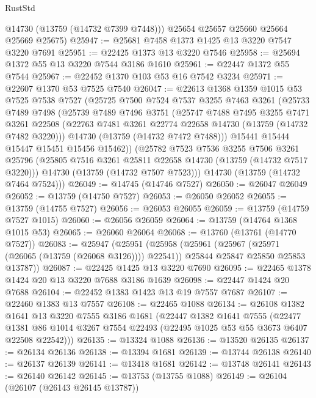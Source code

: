 \begin{lexlean}{RustStd}
\begin{coremodule}
        @14730
        (@13759 (@14732 @7399 @7448)))
      @25654
      @25657
      @25660
      @25664
      @25669
      @25675)
@25947 := @25681 @7458 @1373 @1425 @13 @3220 @7547 @3220 @7691
@25951 := @22425 @1373 @13 @3220 @7546
@25958 := @25694 @1372 @55 @13 @3220 @7544 @3186 @1610
@25961 := @22447 @1372 @55 @7544
@25967 := @22452 @1370 @103 @53 @16 @7542 @3234
@25971 := @22607 @1370 @53 @7525 @7540
@26047 := @22613
    @1368
    @1359
    @1015
    @53
    @7525
    @7538
    @7527
    (@25725
      @7500
      @7524
      @7537
      @3255
      @7463
      @3261
      (@25733
        @7489
        @7498
        (@25739
          @7489
          @7496
          @3751
          (@25747
            @7488
            @7495
            @3255
            @7471
            @3261
            @22508
            (@22763 @7481 @3261 @22774 @22658 @14730 (@13759 (@14732 @7482 @3220)))
            @14730
            (@13759 (@14732 @7472 @7488)))
          @15441
          @15444
          @15447
          @15451
          @15456
          @15462))
      (@25782
        @7523
        @7536
        @3255
        @7506
        @3261
        @25796
        (@25805 @7516 @3261 @25811 @22658 @14730 (@13759 (@14732 @7517 @3220)))
        @14730
        (@13759 (@14732 @7507 @7523)))
      @14730
      (@13759 (@14732 @7464 @7524)))
@26049 := @14745 (@14746 @7527)
@26050 := @26047 @26049
@26052 := @13759 (@14750 @7527)
@26053 := @26050 @26052
@26055 := @13759 (@14755 @7527)
@26056 := @26053 @26055
@26059 := @13759 (@14759 @7527 @1015)
@26060 := @26056 @26059
@26064 := @13759 (@14764 @1368 @1015 @53)
@26065 := @26060 @26064
@26068 := @13760 (@13761 (@14770 @7527))
@26083 := @25947
    (@25951
      (@25958
        (@25961 (@25967 (@25971 (@26065 (@13759 (@26068 @3126)))) @22541))
        @25844
        @25847
        @25850
        @25853
        @13787))
@26087 := @22425 @1425 @13 @3220 @7690
@26095 := @22465 @1378 @1424 @20 @13 @3220 @7688 @3186 @1639
@26098 := @22447 @1424 @20 @7688
@26104 := @22452 @1383 @1423 @13 @19 @7557 @7687
@26107 := @22460 @1383 @13 @7557
@26108 := @22465 @1088
@26134 := @26108
    @1382
    @1641
    @13
    @3220
    @7555
    @3186
    @1681
    (@22447
      @1382
      @1641
      @7555
      (@22477 @1381 @86 @1014 @3267 @7554 @22493 (@22495 @1025 @53 @55 @3673 @6407 @22508 @22542)))
@26135 := @13324 @1088
@26136 := @13520 @26135
@26137 := @26134 @26136
@26138 := @13394 @1681
@26139 := @13744 @26138
@26140 := @26137 @26139
@26141 := @13418 @1681
@26142 := @13748 @26141
@26143 := @26140 @26142
@26145 := @13753 (@13755 @1088)
@26149 := @26104 (@26107 (@26143 @26145 @13787))

\end{coremodule}
\end{lexlean}
